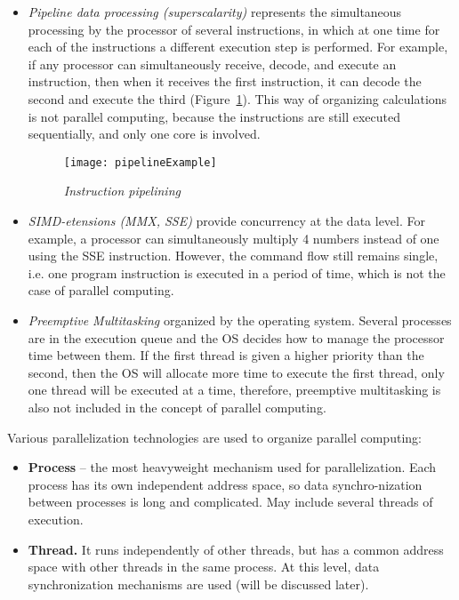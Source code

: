 {		\begin{itemize}
			\item\textit{Pipeline data processing (superscalarity)} represents the simultaneous processing by the processor of several instructions, in which at one time for each of the instructions a different execution step is performed. For example, if any processor can simultaneously receive, decode, and execute an instruction, then when it receives the first instruction, it can decode the second and execute the third (Figure~\ref {pipelineExample:image}). This way of organizing calculations is not parallel computing, because the instructions are still executed sequentially, and only one core is involved.
				\begin{figure}[H]
					\texttt{[image: pipelineExample]}
					\caption{\textit{Instruction pipelining}}
					\label{pipelineExample:image}
				\end{figure}
			\item\textit{SIMD-etensions (MMX, SSE)} provide concurrency at the data level. For example, a processor can simultaneously multiply 4 numbers instead of one using the SSE instruction. However, the command flow still remains single, i.e. one program instruction is executed in a period of time, which is not the case of parallel computing.
			\item\textit{Preemptive Multitasking} organized by the operating system. Several processes are in the execution queue and the OS decides how to manage the processor time between them. If the first thread is given a higher priority than the second, then the OS will allocate more time to execute the first thread, only one thread will be executed at a time, therefore, preemptive multitasking is also not included in the concept of parallel computing.
		\end{itemize}
	\par Various parallelization technologies are used to organize parallel computing:
		\begin{itemize}
			\item\textbf{Process} – the most heavyweight mechanism used for parallelization. Each process has its own independent address space, so data synchro-nization between processes is long and complicated. May include several threads of execution.
			\item\textbf{Thread.} It runs independently of other threads, but has a common address space with other threads in the same process. At this level, data synchronization mechanisms are used (will be discussed later).

\end{itemize}}
